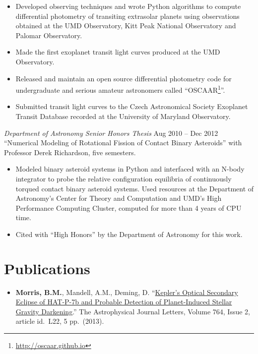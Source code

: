 \documentclass[margin]{res}
\begin{document}
\begin{resume}
\begin{itemize}
\item Developed observing techniques and wrote Python algorithms to compute differential photometry of transiting extrasolar planets using observations obtained at the UMD Observatory, Kitt Peak National Observatory and Palomar Observatory. 

\item Made the first exoplanet transit light curves produced at the UMD Observatory.

\item Released and maintain an open source differential photometry code for undergraduate and serious amateur astronomers called ``OSCAAR\footnote{\url{http://oscaar.github.io}}''.

\item Submitted transit light curves to the Czech Astronomical Society Exoplanet Transit Database recorded at the University of Maryland Observatory.
\end{itemize} 

{\sl Department of Astronomy Senior Honors Thesis} \hfill Aug 2010 -- Dec 2012 \\
``Numerical Modeling of Rotational Fission of Contact Binary Asteroids'' with Professor Derek Richardson, five semesters. 
\begin{itemize}   
\item Modeled binary asteroid systems in Python and interfaced with an N-body integrator to probe the relative configuration equilibria of continuously torqued 
contact binary asteroid systems. Used resources at the Department of Astronomy's Center for Theory and Computation 
and UMD's High Performance Computing Cluster, computed for more than 4 years of CPU time. 
\item Cited with ``High Honors'' by the Department of Astronomy for this work.
\end{itemize}


\section{Publications}
\begin{itemize}   
\item \textbf{Morris, B.M.}, Mandell, A.M., Deming, D. ``\href{http://adsabs.harvard.edu/abs/2013ApJ...764L..22M}{Kepler's Optical Secondary Eclipse of HAT-P-7b and Probable Detection of Planet-Induced Stellar Gravity Darkening}.'' The Astrophysical Journal Letters, Volume 764, Issue 2, article id.\ L22, 5 pp.\ (2013).\\
\end{itemize}



\end{resume}
\end{document}
